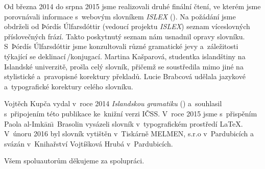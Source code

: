 Od března 2014 do srpna 2015 jsme realizovali druhé finální čtení, ve kterém jsme porovnávali informace s~webovým slovníkem \textit{ISLEX} (\cite {int1}). 
Na požádání jsme obdrželi od Þórdís Úlfarsdóttir (vedoucí projektu \textit{ISLEX}) seznam víceslovných příslovečných frází. Takto poskytnutý seznam nám usnadnil opravy slovníku. 
S~Þórdís Úlfarsdóttir jsme konzultovali různé gramatické jevy a~záležitosti týkající se deklinací\,/\addthin konjugací.
Martina Kašparová, studentka islandštiny na Islandské univerzitě, prošla celý slovník, přičemž se soustředila mimo jiné na stylistické a~pravopisné korektury překladů. 
Lucie Brabcová udělala jazykové a~typografické korektury celého slovníku.

Vojtěch Kupča vydal v~roce 2014 \textit{Islandskou gramatiku} (\cite {is77}) a~souhlasil s~připojením této publikace ke~knižní verzi IČSS.
V~roce 2015 jsme s~přispěním Paola al-Imk\=an\=\i\ Brasolin vysázeli slovník v~typografickém prostředí {\LaTeX}. V~únoru 2016 byl slovník vytištěn v~Tiskárně MELMEN, s.r.o v~Pardubicích a svázán 
v~Knihařství Vojtíšková Hrubá v~Pardubicích. 

\blspace[5]

{\centering Všem spoluautorům děkujeme za spolupráci.\par}
